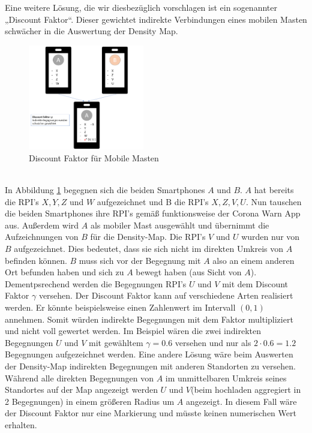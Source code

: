 \documentclass[conference]{IEEEtran}
\begin{document}
Eine weitere Lösung, die wir diesbezüglich vorschlagen ist ein sogenannter „Discount Faktor“. 
Dieser gewichtet indirekte Verbindungen eines mobilen Masten schwächer in die Auswertung der Density Map. \\
\begin{figure}[h]
	\centering
	\includegraphics[width=0.45\textwidth]{"Discount_Faktor"}
	\caption{Discount Faktor für Mobile Masten}
	\label{disc_factor}
\end{figure} \\
In Abbildung \ref{disc_factor} begegnen sich die beiden Smartphones $A$ und $B$. $A$ hat bereits die RPI's $X, Y, Z$ und $W$ aufgezeichnet und B die RPI's $X, Z, V, U$. 
Nun tauschen die beiden Smartphones ihre RPI's gemäß funktionsweise der Corona Warn App aus. Außerdem wird $A$ als mobiler Mast ausgewählt und übernimmt die Aufzeichnungen von $B$ für die Density-Map.
Die RPI's $V$ und $U$ wurden nur von $B$ aufgezeichnet. Dies bedeutet, dass sie sich nicht im direkten Umkreis von $A$ befinden können. $B$ muss sich vor der Begegnung mit $A$ also an einem anderen Ort befunden haben und sich zu $A$ bewegt haben (aus Sicht von $A$).
Dementpsrechend werden die Begegnungen RPI's $U$ und $V$ mit dem Discount Faktor $\gamma$ versehen.
Der Discount Faktor kann auf verschiedene Arten realisiert werden. Er könnte beispielsweise einen Zahlenwert im Intervall $(0,1)$ annehmen. 
Somit würden indirekte Begegnungen mit dem Faktor multipliziert und nicht voll gewertet werden. Im Beispiel wären die zwei indirekten Begegnungen $U$ und $V$ mit gewähltem $\gamma = 0.6$ versehen und nur als $2 \cdot 0.6 = 1.2$ Begegnungen aufgezeichnet werden.
Eine andere Lösung wäre beim Auswerten der Density-Map indirekten Begegnungen mit anderen Standorten zu versehen. 
Während alle direkten Begegnungen von $A$ im unmittelbaren Umkreis seines Standortes auf der Map angezeigt werden $U$ und $V$(beim hochladen aggregiert in 2 Begegnungen) in einem größeren Radius um $A$ angezeigt.
In diesem Fall wäre der Discount Faktor nur eine Markierung und müsste keinen numerischen Wert erhalten. 
\end{document}
